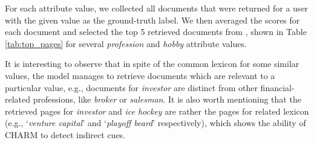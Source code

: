 

For each attribute value, we collected all documents that were returned for a user with the given value as the ground-truth label. We then averaged the scores for each document and selected the top 5 retrieved documents from ,
shown in Table \ref{tab:top_pages} for several \emph{profession} and \emph{hobby} attribute values.

It is interesting to observe that in spite of the common lexicon for some similar values, the model manages to retrieve documents which are relevant to a particular value, e.g., documents for \textit{investor}  are distinct from other financial-related professions, like \textit{broker} or \textit{salesman}.
It is also worth mentioning that the retrieved pages for \textit{investor} and \textit{ice hockey} are rather the pages for related lexicon (e.g., `\textit{venture capital}' and `\textit{playoff beard}' respectively), which shows the ability of CHARM to detect indirect cues.


